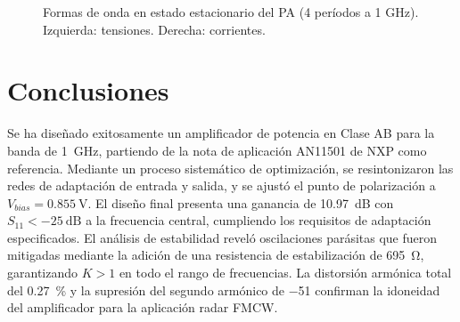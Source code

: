 \begin{figure}[htbp]
\captionsetup{justification=centering}
\caption{Formas de onda en estado estacionario del PA (4 períodos a 1 GHz). \\ Izquierda: tensiones. Derecha: corrientes.}
\label{fig:pa_steady_state_waveforms}
\end{figure}

\section{Conclusiones}

Se ha diseñado exitosamente un amplificador de potencia en Clase AB para la banda de \qty{1}{\GHz}, partiendo de la nota de aplicación AN11501 de NXP como referencia. Mediante un proceso sistemático de optimización, se resintonizaron las redes de adaptación de entrada y salida, y se ajustó el punto de polarización a $V_{bias} = \qty{0,855}{\V}$. El diseño final presenta una ganancia de \qty{10,97}{\dB} con $S_{11} < \qty{-25}{\dB}$ a la frecuencia central, cumpliendo los requisitos de adaptación especificados. El análisis de estabilidad reveló oscilaciones parásitas que fueron mitigadas mediante la adición de una resistencia de estabilización de \qty{695}{\ohm}, garantizando $K > 1$ en todo el rango de frecuencias. La distorsión armónica total del \qty{0,27}{\percent} y la supresión del segundo armónico de \qty{-51}{\dBc} confirman la idoneidad del amplificador para la aplicación radar FMCW.
